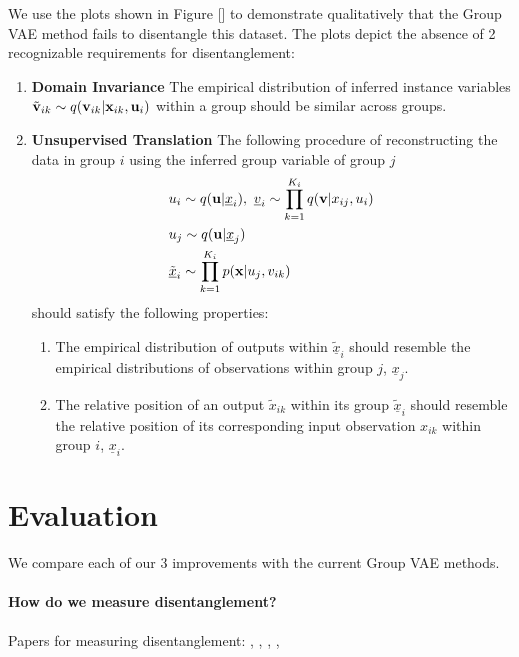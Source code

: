 \documentclass{article}
\begin{document}
We use the plots shown in Figure [] to demonstrate qualitatively that the Group VAE method fails to disentangle this dataset. The plots depict the absence of 2 recognizable requirements for disentanglement:

\begin{enumerate}
    \item \textbf{Domain Invariance} The empirical distribution of inferred instance variables $\tilde{{\mathbf{v}}}_{ik} \sim q({\mathbf{v}}_{ik} | {\mathbf{x}}_{ik}, {\mathbf{u}}_i)$ within a group should be similar across groups.
    \item \textbf{Unsupervised Translation} The following procedure of reconstructing the data in group $i$ using the inferred group variable of group $j$
    \begin{align}
        & u_i \sim q({\mathbf{u}} | \underline{x}_i), ~ \underline{v}_{i} \sim \prod_{k=1}^{K_i} q({\mathbf{v}} | x_{ij}, u_i) \\
        & u_j \sim q({\mathbf{u}} | \underline{x}_j) \\
        & \underline{\tilde{x}}_i \sim \prod_{k=1}^{K_i} p({\mathbf{x}} | u_j, v_{ik})
    \end{align}
    should satisfy the following properties:
    \begin{enumerate}
        \item The empirical distribution of outputs within $\underline{\tilde{x}}_i$ should resemble the empirical distributions of observations within group $j$, $\underline{x}_j$.
        \item The relative position of an output $\tilde{x}_{ik}$ within its group $\underline{\tilde{x}}_i$ should resemble the relative position of its corresponding input observation $x_{ik}$ within group $i$, $\underline{x}_i$.
    \end{enumerate}
\end{enumerate}

\section{Evaluation}

We compare each of our 3 improvements with the current Group VAE methods.

\paragraph{How do we measure disentanglement?}

Papers for measuring disentanglement: \cite{Locatello2019ChallengingCA}, \cite{Tschannen2018RecentAI}, \cite{Eastwood2018AFF}, \cite{Kim2018DisentanglingBF}, \cite{Steenkiste2019AreDR}
\end{document}
